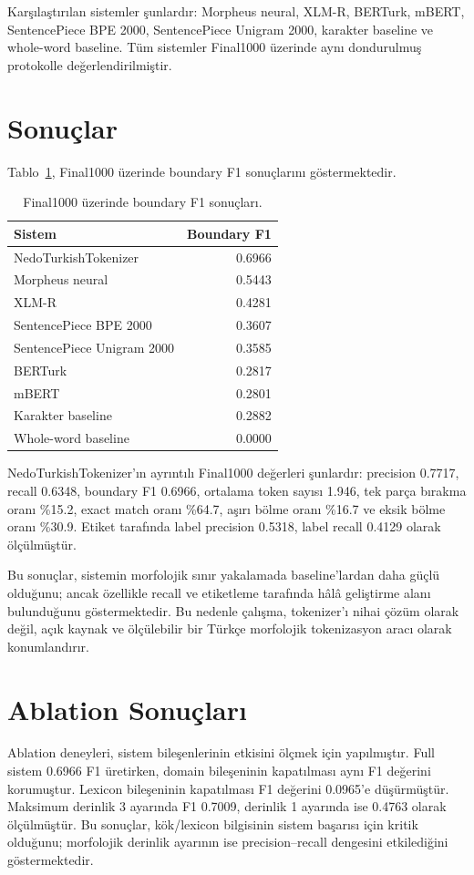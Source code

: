 \documentclass[11pt]{article}
\begin{document}
Karşılaştırılan sistemler şunlardır: Morpheus neural, XLM-R, BERTurk, mBERT, SentencePiece BPE 2000, SentencePiece Unigram 2000, karakter baseline ve whole-word baseline. Tüm sistemler Final1000 üzerinde aynı dondurulmuş protokolle değerlendirilmiştir.

\section{Sonuçlar}
Tablo~\ref{tab:main-results}, Final1000 üzerinde boundary F1 sonuçlarını göstermektedir.

\begin{table}[h]
\centering
\begin{tabular}{lr}
\toprule
Sistem & Boundary F1 \\
\midrule
NedoTurkishTokenizer & 0.6966 \\
Morpheus neural & 0.5443 \\
XLM-R & 0.4281 \\
SentencePiece BPE 2000 & 0.3607 \\
SentencePiece Unigram 2000 & 0.3585 \\
BERTurk & 0.2817 \\
mBERT & 0.2801 \\
Karakter baseline & 0.2882 \\
Whole-word baseline & 0.0000 \\
\bottomrule
\end{tabular}
\caption{Final1000 üzerinde boundary F1 sonuçları.}
\label{tab:main-results}
\end{table}

NedoTurkishTokenizer'ın ayrıntılı Final1000 değerleri şunlardır: precision 0.7717, recall 0.6348, boundary F1 0.6966, ortalama token sayısı 1.946, tek parça bırakma oranı \%15.2, exact match oranı \%64.7, aşırı bölme oranı \%16.7 ve eksik bölme oranı \%30.9. Etiket tarafında label precision 0.5318, label recall 0.4129 olarak ölçülmüştür.

Bu sonuçlar, sistemin morfolojik sınır yakalamada baseline'lardan daha güçlü olduğunu; ancak özellikle recall ve etiketleme tarafında hâlâ geliştirme alanı bulunduğunu göstermektedir. Bu nedenle çalışma, tokenizer'ı nihai çözüm olarak değil, açık kaynak ve ölçülebilir bir Türkçe morfolojik tokenizasyon aracı olarak konumlandırır.

\section{Ablation Sonuçları}
Ablation deneyleri, sistem bileşenlerinin etkisini ölçmek için yapılmıştır. Full sistem 0.6966 F1 üretirken, domain bileşeninin kapatılması aynı F1 değerini korumuştur. Lexicon bileşeninin kapatılması F1 değerini 0.0965'e düşürmüştür. Maksimum derinlik 3 ayarında F1 0.7009, derinlik 1 ayarında ise 0.4763 olarak ölçülmüştür. Bu sonuçlar, kök/lexicon bilgisinin sistem başarısı için kritik olduğunu; morfolojik derinlik ayarının ise precision--recall dengesini etkilediğini göstermektedir.
\end{document}
